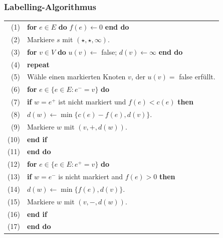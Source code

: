 \documentclass[smaller]{beamer}
\begin{document}
\begin{frame}
 \frametitle{Labelling-Algorithmus}

\begin{tabular}{rl}
 (1)& \textbf{for} $e \in E$ \textbf{do} $f(e) \leftarrow 0$ \textbf{end do} \\
 (2)& Markiere $s$ mit $(\star,\star,\infty)$. \\
 (3)& \textbf{for} $v \in V$ \textbf{do} $u(v) \leftarrow$ false; $d(v) \leftarrow \infty$ \textbf{end do} \\
 (4)& \textbf{repeat} \\
 (5)& \qquad Wähle einen markierten Knoten $v$, der $u(v) =$ false erfüllt. \\
 (6)& \qquad \textbf{for} $e \in \big\{ e \in E : e^- = v \big\}$ \textbf{do} \\
 (7)& \qquad\qquad \textbf{if} $w=e^+$ ist nicht markiert und $f(e) < c(e)$ \textbf{then} \\
 (8)& \qquad\qquad\qquad $d(w) \leftarrow \min \big\{ c(e)-f(e), d(v) \big\}$. \\
 (9)& \qquad\qquad\qquad Markiere $w$ mit $(v,+, d(w))$. \\
 (10)& \qquad\qquad \textbf{end if} \\
 (11)& \qquad \textbf{end do} \\
 (12)& \qquad \textbf{for} $e \in \bigl\{ e \in E : e^+ = v \bigr\}$ \textbf{do} \\
 (13)& \qquad\qquad \textbf{if} $w=e^-$ is nicht markiert and $f(e)>0$ \textbf{then} \\
 (14)& \qquad\qquad\qquad $d(w) \leftarrow \min \big\{ f(e), d(v) \big\}$. \\
 (15)& \qquad\qquad\qquad Markiere $w$ mit $(v,-, d(w))$. \\
 (16)& \qquad\qquad \textbf{end if} \\
 (17)& \qquad \textbf{end do} \\
\end{tabular}
\end{frame}
\end{document}
